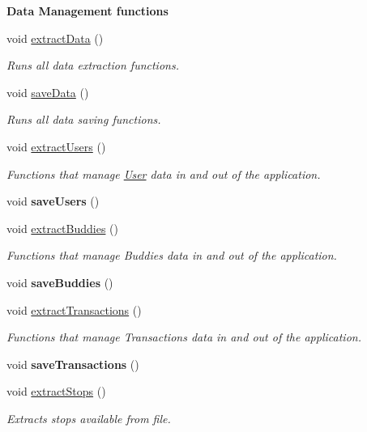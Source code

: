 \begin{Indent}\textbf{ Data Management functions}\par
\begin{DoxyCompactItemize}
\item 
void \hyperlink{group___agency_ga20bc20b90914b5e446b683dcd7f6d0ef}{extract\+Data} ()
\begin{DoxyCompactList}\small\item\em Runs all data extraction functions. \end{DoxyCompactList}\item 
void \hyperlink{group___agency_ga67c29f4711b1596630ae970e6a9027ac}{save\+Data} ()
\begin{DoxyCompactList}\small\item\em Runs all data saving functions. \end{DoxyCompactList}\item 
void \hyperlink{group___agency_ga659e4c6df03779b524f37b1c8fb5221d}{extract\+Users} ()
\begin{DoxyCompactList}\small\item\em Functions that manage \hyperlink{class_user}{User} data in and out of the application. \end{DoxyCompactList}\item 
void {\bfseries save\+Users} ()
\item 
void \hyperlink{group___agency_ga93c45528d2114a557a1e0b23498e178a}{extract\+Buddies} ()
\begin{DoxyCompactList}\small\item\em Functions that manage Buddies data in and out of the application. \end{DoxyCompactList}\item 
void {\bfseries save\+Buddies} ()
\item 
void \hyperlink{group___agency_gadfda62c1a33db5f797098d0391e6ee87}{extract\+Transactions} ()
\begin{DoxyCompactList}\small\item\em Functions that manage Transactions data in and out of the application. \end{DoxyCompactList}\item 
void {\bfseries save\+Transactions} ()
\item 
void \hyperlink{group___agency_ga10184101969b3eeea8eea72cb058fbd4}{extract\+Stops} ()
\begin{DoxyCompactList}\small\item\em Extracts stops available from file. \end{DoxyCompactList}\item 

\end{DoxyCompactItemize}
\end{Indent}
